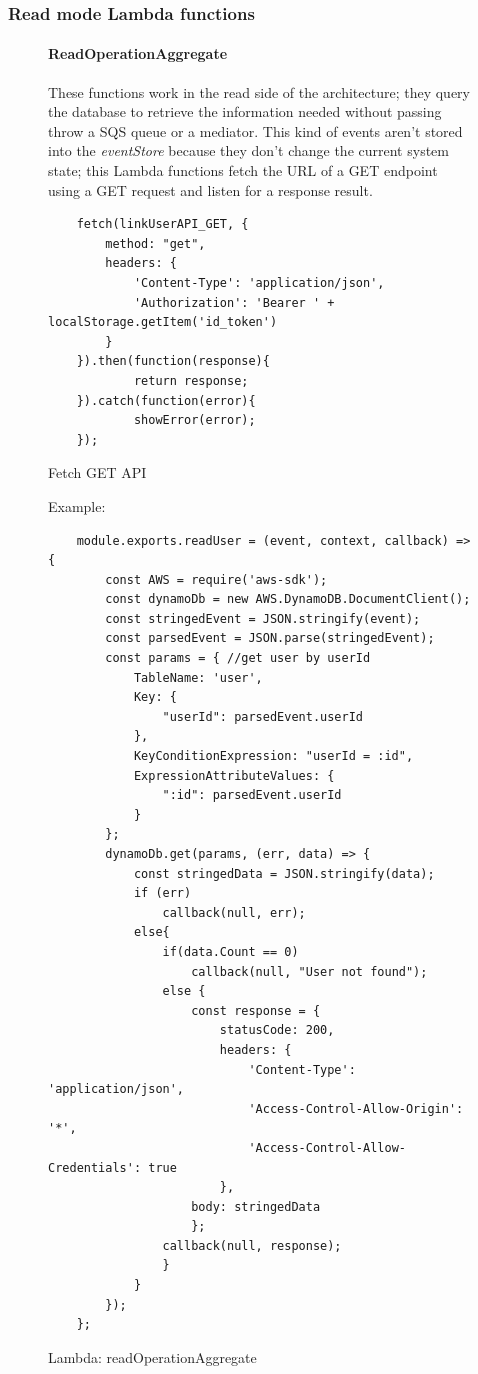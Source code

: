 \subsubsection{Read mode Lambda functions}
\begin{figure} [H]
\paragraph{ReadOperationAggregate} \Spazio
These functions work in the read side of the architecture; they query the database to retrieve the information needed without passing throw a SQS queue or a mediator. This kind of events aren't stored into the \emph{eventStore} because they don't change the current system state; this Lambda functions fetch the URL of a GET endpoint using a GET request and listen for a response result.
\begin{lstlisting}
	fetch(linkUserAPI_GET, {
		method: "get",
		headers: {
			'Content-Type': 'application/json',
			'Authorization': 'Bearer ' + localStorage.getItem('id_token')
		}
	}).then(function(response){
			return response;
	}).catch(function(error){
			showError(error);
	});
\end{lstlisting}
	\caption{Fetch GET API}\label{}
\end{figure}

\begin{figure} [H]
Example:
\begin{lstlisting}
	module.exports.readUser = (event, context, callback) => {
		const AWS = require('aws-sdk');
		const dynamoDb = new AWS.DynamoDB.DocumentClient();
		const stringedEvent = JSON.stringify(event);
		const parsedEvent = JSON.parse(stringedEvent);
		const params = { //get user by userId
			TableName: 'user',
			Key: {
				"userId": parsedEvent.userId
			},
			KeyConditionExpression: "userId = :id",
			ExpressionAttributeValues: {
				":id": parsedEvent.userId
			}
		};
		dynamoDb.get(params, (err, data) => {
			const stringedData = JSON.stringify(data);
			if (err)
				callback(null, err);
			else{
				if(data.Count == 0)
					callback(null, "User not found");
				else {
					const response = {
						statusCode: 200,
						headers: {
							'Content-Type': 'application/json',
							'Access-Control-Allow-Origin': '*',
							'Access-Control-Allow-Credentials': true
						},
					body: stringedData
					};
				callback(null, response);
				}      
			}
		});
	};
\end{lstlisting}
	\caption{Lambda: readOperationAggregate}
\end{figure}

